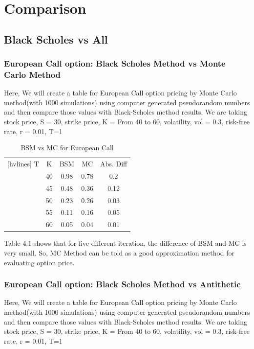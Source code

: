 \chapter{Comparison}
\section{Black Scholes vs All}
\subsection{European Call option: Black Scholes Method vs Monte Carlo Method}

Here, We will create a table for European Call option pricing by Monte Carlo method(with 1000
simulations) using computer generated pseudorandom numbers and then compare those
values with Black-Scholes method results. We are taking stock price, S = 30, strike price, K = From 40 to 60, volatility, vol = 0.3, risk-free rate, r = 0.01, T=1

\begin{table}[H]
\begin{center}
	\begin{NiceTabular}{|c|c|c|c|c|}[hvlines]
		 T & K & BSM & MC & Abs. Diff \\ 
		& 40 &   0.98 &   0.78 &   0.2 \\
		& 45 &   0.48 &   0.36 &   0.12 \\
		& 50 &   0.23 &   0.26 &   0.03 \\ 
		& 55 &   0.11 &   0.16 &   0.05 \\
		& 60 &   0.05 &   0.04 &   0.01 \\
	\end{NiceTabular}
\end{center}
\caption{BSM vs MC for European Call}
\end{table}

\noindent Table 4.1 shows that for five different iteration, the difference of BSM and MC is very small. So, MC Method can be told as a good approximation method for evaluating option price.

\subsection{European Call option: Black Scholes Method vs Antithetic}

Here, We will create a table for European Call option pricing by Monte Carlo method(with 1000
simulations) using computer generated pseudorandom numbers and then compare those
values with Black-Scholes method results. We are taking stock price, S = 30, strike price, K = From 40 to 60, volatility, vol = 0.3, risk-free rate, r = 0.01, T=1


